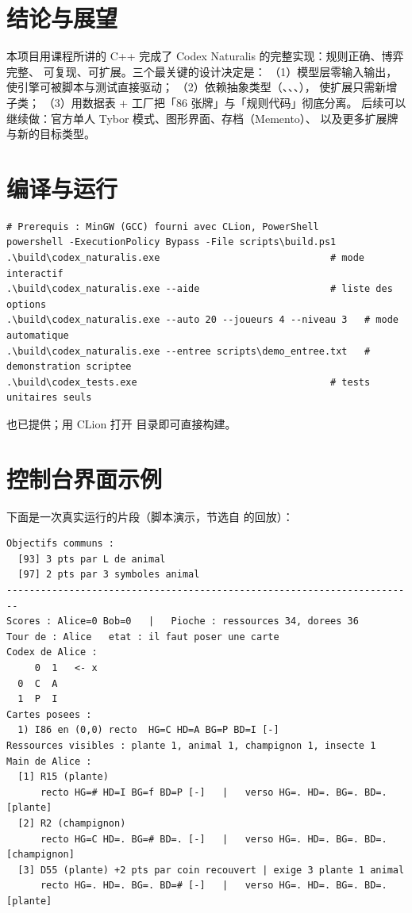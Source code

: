 \section{结论与展望}
本项目用课程所讲的 C++ 完成了 Codex Naturalis 的完整实现：规则正确、博弈完整、
可复现、可扩展。三个最关键的设计决定是：
（1）模型层零输入输出，使引擎可被脚本与测试直接驱动；
（2）依赖抽象类型（、、、），
使扩展只需新增子类；
（3）用数据表 + 工厂把「86 张牌」与「规则代码」彻底分离。
后续可以继续做：官方单人 Tybor 模式、图形界面、存档（Memento）、
以及更多扩展牌与新的目标类型。

\appendix
\section{编译与运行}
\begin{lstlisting}
# Prerequis : MinGW (GCC) fourni avec CLion, PowerShell
powershell -ExecutionPolicy Bypass -File scripts\build.ps1
.\build\codex_naturalis.exe                              # mode interactif
.\build\codex_naturalis.exe --aide                       # liste des options
.\build\codex_naturalis.exe --auto 20 --joueurs 4 --niveau 3   # mode automatique
.\build\codex_naturalis.exe --entree scripts\demo_entree.txt   # demonstration scriptee
.\build\codex_tests.exe                                  # tests unitaires seuls
\end{lstlisting}
 也已提供；用 CLion 打开  目录即可直接构建。

\section{控制台界面示例}
下面是一次真实运行的片段（脚本演示，节选自  的回放）：
\begin{lstlisting}
Objectifs communs :
  [93] 3 pts par L de animal
  [97] 2 pts par 3 symboles animal
------------------------------------------------------------------------
Scores : Alice=0 Bob=0   |   Pioche : ressources 34, dorees 36
Tour de : Alice   etat : il faut poser une carte
Codex de Alice :
     0  1   <- x
  0  C  A
  1  P  I
Cartes posees :
  1) I86 en (0,0) recto  HG=C HD=A BG=P BD=I [-]
Ressources visibles : plante 1, animal 1, champignon 1, insecte 1
Main de Alice :
  [1] R15 (plante)
      recto HG=# HD=I BG=f BD=P [-]   |   verso HG=. HD=. BG=. BD=. [plante]
  [2] R2 (champignon)
      recto HG=C HD=. BG=# BD=. [-]   |   verso HG=. HD=. BG=. BD=. [champignon]
  [3] D55 (plante) +2 pts par coin recouvert | exige 3 plante 1 animal
      recto HG=. HD=. BG=. BD=# [-]   |   verso HG=. HD=. BG=. BD=. [plante]
\end{lstlisting}

